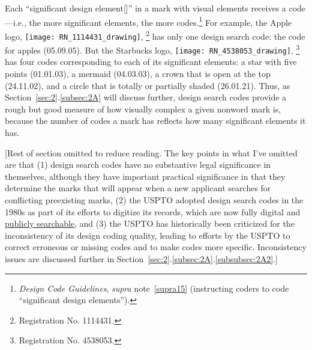 \documentclass[letterpaper, 11pt, oneside]{article}
\begin{document}
Each ``significant design element[]'' in a mark with visual elements receives a code—i.e., the more significant elements, the more codes.\footnote{\textit{Design Code Guidelines}, \textit{supra} note~\ref{supra15} (instructing coders to code ``significant design elements'').} For example, the Apple logo, \texttt{[image: RN\_1114431\_drawing]}, \footnote{Registration No. 1114431.} has only one design search code: the code for apples (05.09.05). But the Starbucks logo, \texttt{[image: RN\_4538053\_drawing]}, \footnote{Registration No. 4538053.} has four codes corresponding to each of its significant elements: a star with five points (01.01.03), a mermaid (04.03.03), a crown that is open at the top (24.11.02), and a circle that is totally or partially shaded (26.01.21). Thus, as Section~\ref{sec:2}.\ref{subsec:2A} will discuss further, design search codes provide a rough but good measure of how visually complex a given nonword mark is, because the number of codes a mark has reflects how many significant elements it has.

[Rest of section omitted to reduce reading. The key points in what I've omitted are that (1) design search codes have no substantive legal significance in themselves, although they have important practical significance in that they determine the marks that will appear when a new applicant searches for conflicting preexisting marks, (2) the USPTO adopted design search codes in the 1980s as part of its efforts to digitize its records, which are now fully digital and \href{https://tmsearch.uspto.gov/search/search-information}{publicly searchable}, and (3) the USPTO has historically been criticized for the inconsistency of its design coding quality, leading to efforts by the USPTO to correct erroneous or missing codes and to make codes more specific. Inconsistency issues are discussed further in Section~\ref{sec:2}.\ref{subsec:2A}.\ref{subsubsec:2A2}.]
\end{document}
